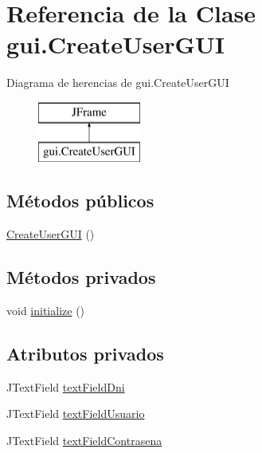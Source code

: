 \hypertarget{classgui_1_1CreateUserGUI}{}\section{Referencia de la Clase gui.\+Create\+User\+G\+UI}
\label{classgui_1_1CreateUserGUI}
Diagrama de herencias de gui.\+Create\+User\+G\+UI\begin{figure}[H]
\begin{center}
\leavevmode
\includegraphics[height=2.000000cm]{classgui_1_1CreateUserGUI}
\end{center}
\end{figure}
\subsection*{Métodos públicos}
\begin{DoxyCompactItemize}
\item 
\mbox{\hyperlink{classgui_1_1CreateUserGUI_acadadd60afe0885fbe2930dd9e5b13e0}{Create\+User\+G\+UI}} ()
\end{DoxyCompactItemize}
\subsection*{Métodos privados}
\begin{DoxyCompactItemize}
\item 
void \mbox{\hyperlink{classgui_1_1CreateUserGUI_a781be901f97fc6bcea7d161e3d8e47c6}{initialize}} ()
\end{DoxyCompactItemize}
\subsection*{Atributos privados}
\begin{DoxyCompactItemize}
\item 
J\+Text\+Field \mbox{\hyperlink{classgui_1_1CreateUserGUI_a5ed1279425631f9ce5630d3a7e38e795}{text\+Field\+Dni}}
\item 
J\+Text\+Field \mbox{\hyperlink{classgui_1_1CreateUserGUI_a4e740cefebabdcde4027964a4bd6cba7}{text\+Field\+Usuario}}
\item 
J\+Text\+Field \mbox{\hyperlink{classgui_1_1CreateUserGUI_a09f197ef1142b2ec48107ace780c75ac}{text\+Field\+Contrasena}}
\end{DoxyCompactItemize}



